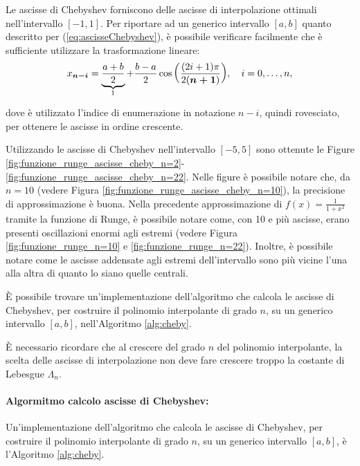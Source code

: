 \begin{remark}
    Le ascisse di Chebyshev forniscono delle ascisse di interpolazione ottimali nell'intervallo $[-1,1]$. Per riportare ad un generico intervallo $[a,b]$ quanto descritto per (\ref{eq:ascisseChebyshev}), è possibile verificare facilmente che è sufficiente utilizzare la trasformazione lineare:
    \begin{equation*}
        x_{\boldsymbol{n-i}} =\underbrace{\frac{a+b}{2}}_{\footnotemark} + \frac{b-a}{2}\cos{\left(\frac{(2i+1)\pi}{2(\boldsymbol{n+1})}\right)},\quad i=0,\hdots,n,
    \end{equation*}
    dove è utilizzato l'indice di enumerazione in notazione $n-i$, quindi rovesciato, per ottenere le ascisse in ordine crescente. 
\end{remark}

Utilizzando le ascisse di Chebyshev nell'intervallo $[-5,5]$ sono ottenute le Figure \ref{fig:funzione_runge_ascisse_cheby_n=2}-\ref{fig:funzione_runge_ascisse_cheby_n=22}. Nelle figure è possibile notare che, da $n=10$ (vedere Figura \ref{fig:funzione_runge_ascisse_cheby_n=10}), la precisione di approssimazione è buona. Nella precedente approssimazione di $f(x)=\frac{1}{1+x^2}$ tramite la funzione di Runge, è possibile notare come, con 10 e più ascisse, erano presenti oscillazioni enormi agli estremi (vedere Figura \ref{fig:funzione_runge_n=10} e \ref{fig:funzione_runge_n=22}). Inoltre, è possibile notare come le ascisse addensate agli estremi dell'intervallo sono più vicine l'una alla altra di quanto lo siano quelle centrali.

È possibile trovare un'implementazione dell'algoritmo che calcola le ascisse di Chebyshev, per costruire il polinomio interpolante di grado $n$, su un generico intervallo $[a, b]$, nell'Algoritmo \ref{alg:cheby}.

\begin{remark}
    È necessario ricordare che al crescere del grado $n$ del polinomio interpolante, la scelta delle ascisse di interpolazione non deve fare crescere troppo la costante di Lebesgue $\Lambda_n$.
\end{remark}

\paragraph{Algormitmo calcolo ascisse di Chebyshev:} Un'implementazione dell'algoritmo che calcola le ascisse di Chebyshev, per costruire il polinomio interpolante di grado $n$, su un generico intervallo $[a, b]$, è l'Algoritmo \ref{alg:cheby}.

